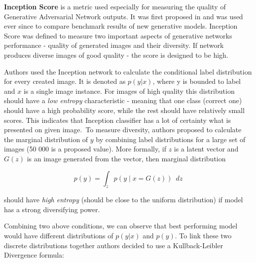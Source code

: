 \documentclass[12pt,a4paper,openany]{book}
\begin{document}


\noindent \textbf{Inception Score} is a metric used especially for measuring the quality of Generative Adversarial Network outputs. It was first proposed in \cite{improvedgans} and was used ever since to compare benchmark results of new generative models. Inception Score was defined to measure two important aspects of generative networks performance - quality of generated images and their diversity. If network produces diverse images of good quality - the score is designed to be high.\


\noindent Authors used the Inception network \cite{inception} to calculate the conditional label distribution for every created image. It is denoted as $p(y|x)$, where y is bounded to label and $x$ is a single image instance. For images of high quality this distribution should have a \textit{low entropy} characteristic - meaning that one class (correct one) should have a high probability score, while the rest should have relatively small scores. This indicates that Inception classifier has a lot of certainty what is presented on given image.\ 
To measure diversity, authors proposed to calculate the marginal distribution of $y$ by combining label distributions for a large set of images (50 000 is a proposed value). More formally, if $z$ is a latent vector and $G(z)$ is an image generated from the vector, then marginal distribution 

\begin{equation}
p(y) = \int_{z} p(y \mid x=G(z)) \phantom{v} dz
\end{equation}

\noindent should have \textit{high entropy} (should be close to the uniform distribution) if model has a strong diversifying power.\

\noindent Combining two above conditions, we can observe that best performing model would have different distributions of $p(y|x)$ and $p(y)$. To link these two discrete distributions together authors decided to use a Kullback-Leibler Divergence formula:
\end{document}
